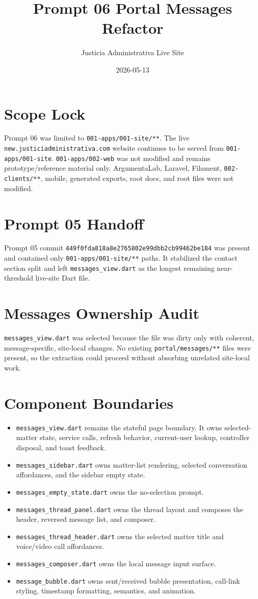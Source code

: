 \documentclass[11pt]{article}
\title{Prompt 06 Portal Messages Refactor}
\author{Justicia Administrativa Live Site}
\date{2026-05-13}
\begin{document}
\maketitle

\section*{Scope Lock}
Prompt 06 was limited to \texttt{001-apps/001-site/**}. The live
\texttt{new.justiciadministrativa.com} website continues to be served from
\texttt{001-apps/001-site}. \texttt{001-apps/002-web} was not modified and
remains prototype/reference material only. ArgumentaLab, Laravel, Filament,
\texttt{002-clients/**}, mobile, generated exports, root docs, and root files
were not modified.

\section*{Prompt 05 Handoff}
Prompt 05 commit
\texttt{449f0fda818a8e2765802e99dbb2cb99462be184} was present and contained
only \texttt{001-apps/001-site/**} paths. It stabilized the contact section
split and left \texttt{messages\_view.dart} as the longest remaining
near-threshold live-site Dart file.

\section*{Messages Ownership Audit}
\texttt{messages\_view.dart} was selected because the file was dirty only with
coherent, message-specific, site-local changes. No existing
\texttt{portal/messages/**} files were present, so the extraction could proceed
without absorbing unrelated site-local work.

\section*{Component Boundaries}
\begin{itemize}
  \item \texttt{messages\_view.dart} remains the stateful page boundary. It
  owns selected-matter state, service calls, refresh behavior, current-user
  lookup, controller disposal, and toast feedback.
  \item \texttt{messages\_sidebar.dart} owns matter-list rendering, selected
  conversation affordances, and the sidebar empty state.
  \item \texttt{messages\_empty\_state.dart} owns the no-selection prompt.
  \item \texttt{messages\_thread\_panel.dart} owns the thread layout and
  composes the header, reversed message list, and composer.
  \item \texttt{messages\_thread\_header.dart} owns the selected matter title
  and voice/video call affordances.
  \item \texttt{messages\_composer.dart} owns the local message input surface.
  \item \texttt{message\_bubble.dart} owns sent/received bubble presentation,
  call-link styling, timestamp formatting, semantics, and animation.
\end{itemize}
\end{document}
